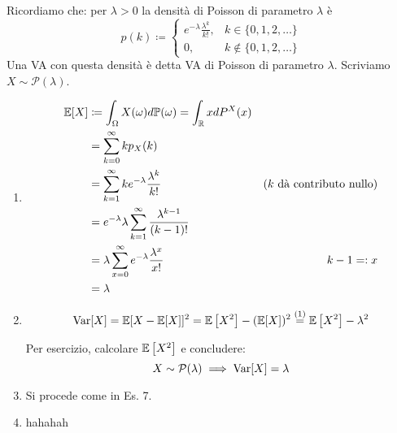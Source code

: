 \Soluzione

Ricordiamo che: per $\lambda  >0$ la densità di Poisson di parametro $\lambda $ è
\begin{equation*}
p(k) \coloneqq
\begin{cases}
e^{-\lambda }\frac{\lambda^{k}}{k!} , & k\in \{0,1,2,\dots \}\\
0, & k\notin \{0,1,2,\dots \}
\end{cases}
\end{equation*}
Una VA con questa densità è detta VA di Poisson di parametro $\lambda $. Scriviamo $X\sim \mathcal{P}(\lambda)$.
\begin{enumerate}
\item
\begin{align*}
\mathbb{E}[X] & \coloneqq \int_{\Omega } X(\omega) d\mathbb{P}(\omega) =\int_{\mathbb{R}} xdP^{X}(x) & \\
 & =\sum\limits_{k=0}^{\infty } kp_{X}(k) & \\
 & =\sum\limits_{k=1}^{\infty } ke^{-\lambda }\frac{\lambda^{k}}{k!} & \text{(} k\ \text{dà contributo nullo)}\\
 & =e^{-\lambda } \lambda \sum\limits_{k=1}^{\infty }\frac{\lambda^{k-1}}{(k-1) !} & \\
 & =\lambda \sum\limits_{x=0}^{\infty } e^{-\lambda }\frac{\lambda^{x}}{x!} & k-1=:x\\
 & =\lambda  & 
\end{align*}
\item \begin{equation*}
\operatorname{Var}[ X] =\mathbb{E}[ X-\mathbb{E}[ X]]^{2} =\mathbb{E}\left[ X^{2}\right] -(\mathbb{E}[ X])^{2}\overset{(1)}{=}\mathbb{E}\left[ X^{2}\right] -\lambda ^{2}
\end{equation*}

Per esercizio, calcolare $\mathbb{E}\left[ X^{2}\right]$ e concludere:\begin{equation*}
X\sim \mathcal{P}(\lambda) \implies \operatorname{Var}[ X] =\lambda 
\end{equation*}
\item Si procede come in Es. 7.
\item hahahah
\end{enumerate}

\Soluzione

